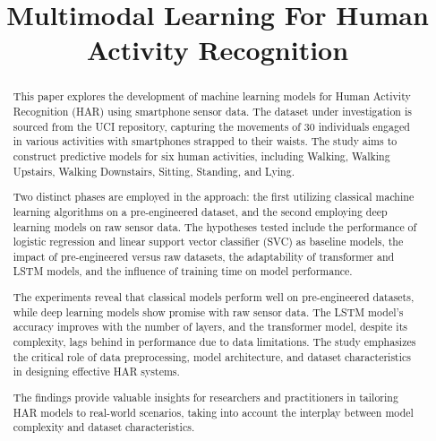\documentclass[conference]{IEEEtran}
\begin{document}
\title{Multimodal Learning For Human Activity Recognition
}

\author{
\and
{}
}

\maketitle

\begin{abstract}
This paper explores the development of machine learning models for Human Activity Recognition (HAR) using smartphone sensor data. The dataset under investigation is sourced from the UCI repository, capturing the movements of 30 individuals engaged in various activities with smartphones strapped to their waists. The study aims to construct predictive models for six human activities, including Walking, Walking Upstairs, Walking Downstairs, Sitting, Standing, and Lying.

Two distinct phases are employed in the approach: the first utilizing classical machine learning algorithms on a pre-engineered dataset, and the second employing deep learning models on raw sensor data. The hypotheses tested include the performance of logistic regression and linear support vector classifier (SVC) as baseline models, the impact of pre-engineered versus raw datasets, the adaptability of transformer and LSTM models, and the influence of training time on model performance.

The experiments reveal that classical models perform well on pre-engineered datasets, while deep learning models show promise with raw sensor data. The LSTM model's accuracy improves with the number of layers, and the transformer model, despite its complexity, lags behind in performance due to data limitations. The study emphasizes the critical role of data preprocessing, model architecture, and dataset characteristics in designing effective HAR systems.

The findings provide valuable insights for researchers and practitioners in tailoring HAR models to real-world scenarios, taking into account the interplay between model complexity and dataset characteristics.
\end{abstract}
\end{document}
